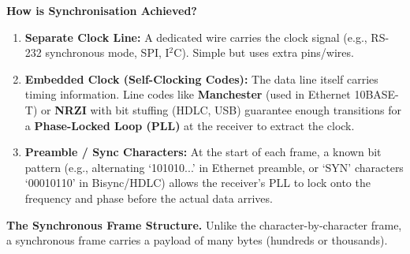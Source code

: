 \documentclass[11pt]{article}
\begin{document}
\textbf{How is Synchronisation Achieved?}
\begin{enumerate}
    \item \textbf{Separate Clock Line:} A dedicated wire carries the clock signal (e.g., RS-232 synchronous mode, SPI, I$^2$C). Simple but uses extra pins/wires.
    \item \textbf{Embedded Clock (Self-Clocking Codes):} The data line itself carries timing information. Line codes like \textbf{Manchester} (used in Ethernet 10BASE-T) or \textbf{NRZI} with bit stuffing (HDLC, USB) guarantee enough transitions for a \textbf{Phase-Locked Loop (PLL)} at the receiver to extract the clock.
    \item \textbf{Preamble / Sync Characters:} At the start of each frame, a known bit pattern (e.g., alternating `101010...' in Ethernet preamble, or `SYN' characters `00010110' in Bisync/HDLC) allows the receiver's PLL to lock onto the frequency and phase before the actual data arrives.
\end{enumerate}

\textbf{The Synchronous Frame Structure.}
Unlike the character-by-character frame, a synchronous frame carries a payload of many bytes (hundreds or thousands).
\end{document}
